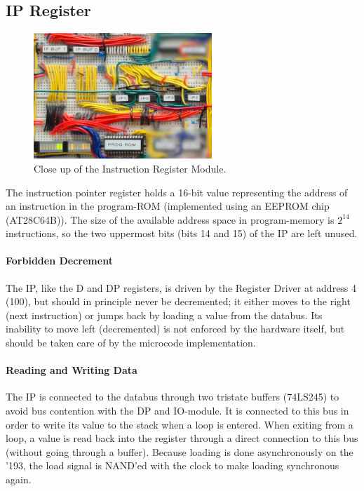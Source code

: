 
\newpage\subsection{IP Register}
\begin{figure}[H]
  \centering
  \includegraphics[width=0.6\textwidth]{img/ipregistercloseup}
  \caption{Close up of the Instruction Register Module.}
  \label{fig:iregcloseup}
\end{figure}

The instruction pointer register holds a 16-bit value representing the address of an instruction in the program-ROM (implemented using an EEPROM chip (AT28C64B)). The size of the available address space in program-memory is $2^{14}$ instructions, so the two uppermost bits (bits 14 and 15) of the IP are left unused.

\paragraph{Forbidden Decrement} The IP, like the D and DP registers, is driven by the Register Driver at address 4 (100), but should in principle never be decremented; it either moves to the right (next instruction) or jumps back by loading a value from the databus. Its inability to move left (decremented) is not enforced by the hardware itself, but should be taken care of by the microcode implementation.

\paragraph{Reading and Writing Data} The IP is connected to the databus through two tristate buffers (74LS245) to avoid bus contention with the DP and IO-module. It is connected to this bus in order to write its value to the stack when a loop is entered. When exiting from a loop, a value is read back into the register through a direct connection to this bus (without going through a buffer). Because loading is done asynchronously on the '193, the load signal is NAND'ed with the clock to make loading synchronous again.

